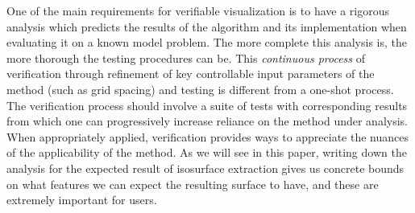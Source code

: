
One of the main requirements for verifiable visualization is to have 
a rigorous analysis which predicts the results of the algorithm and
its implementation when evaluating it on a known model problem.  The
more complete this analysis is, the more thorough the testing procedures
can be. This \emph{continuous process} of verification through refinement
of key controllable input parameters of the method (such as grid spacing) 
and testing is different from a one-shot process.
%
%
The verification process should involve a suite of tests with
corresponding results from which one can
progressively increase reliance on the method under analysis. 
When appropriately applied, verification 
provides ways to appreciate the nuances of the applicability of the
method. As we will see in this paper, writing down the analysis for the
expected result of isosurface extraction gives us concrete
bounds on what features we can expect the resulting surface to have,
and these are extremely important for users.

%
%

